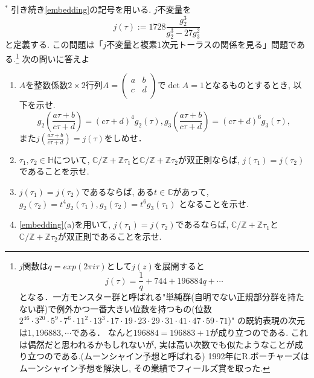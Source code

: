 \documentclass[dvipdfmx,a4paper,11pt]{article}
\newcommand{\Z}{\mathbb{Z}}
\newcommand{\C}{\mathbb{C}}
\theoremstyle{definition}
\begin{document}
 
\item $^{*}$ \label{j_invariant} 引き続き\ref{embedding}の記号を用いる. 
$j$不変量を
$$
j(\tau):= 1728\frac{g_{2}^{3}}{g_{2}^{3} - 27 g_{3}^{2}}
$$
と定義する. この問題は「$j$不変量と複素1次元トーラスの関係を見る」問題である.\footnote{$j$関数は$q=exp(2 \pi i \tau)$として$j(z)$を展開すると
$$
j(\tau) = \frac{1}{q} + 744+ 196884 q + \cdots 
$$
となる．一方モンスター群と呼ばれる"単純群(自明でない正規部分群を持たない群)で例外かつ一番大きい位数を持つもの(位数$2^{46} \cdot 3^{20}\cdot 5^9 \cdot 7^6\cdot11^2\cdot13^3\cdot17\cdot19\cdot23\cdot29\cdot31\cdot41\cdot47\cdot59\cdot71$)"
の既約表現の次元は$1,196883,\cdots$である． なんと$196884 = 196883 +1$が成り立つのである. これは偶然だと思われるかもしれないが, 実は高い次数でも似たようなことが成り立つのである.(ムーンシャイン予想と呼ばれる) 1992年にR.ボーチャーズはムーンシャイン予想を解決し, その業績でフィールズ賞を取った.
}
次の問いに答えよ
\begin{enumerate}
\item $A$を整数係数$2 \times 2$行列$A=\begin{pmatrix}
a & b \\
c & d \\
\end{pmatrix}$で$\det A =1$となるものとするとき, 以下を示せ.
$$
g_2\left(\frac{a \tau + b}{c \tau + d}\right) = (c \tau + d)^4 g_2(\tau), 
g_3\left(\frac{a \tau + b}{c \tau + d} \right) = (c \tau + d)^6 g_3(\tau), 
$$
また$j(\frac{a \tau + b}{c \tau + d}) = j(\tau)$をしめせ．
\item $\tau_1, \tau_2 \in \mathbb{H}$について, $\C/\Z + \Z \tau_1$と$\C/\Z + \Z \tau_2$が双正則ならば, $j(\tau_1) = j(\tau_2)$であることを示せ.
\item $j(\tau_1) = j(\tau_2)$であるならば, ある$t \in \C$があって, $ g_2(\tau_2) = t^4 g_2(\tau_1), g_3(\tau_2) = t^6 g_3(\tau_1) $
となることを示せ.
\item \ref{embedding}(a)を用いて, $j(\tau_1) = j(\tau_2)$であるならば, $\C/\Z + \Z \tau_1$と$\C/\Z + \Z \tau_2$が双正則であることを示せ. 
\end{enumerate}
\end{document}
